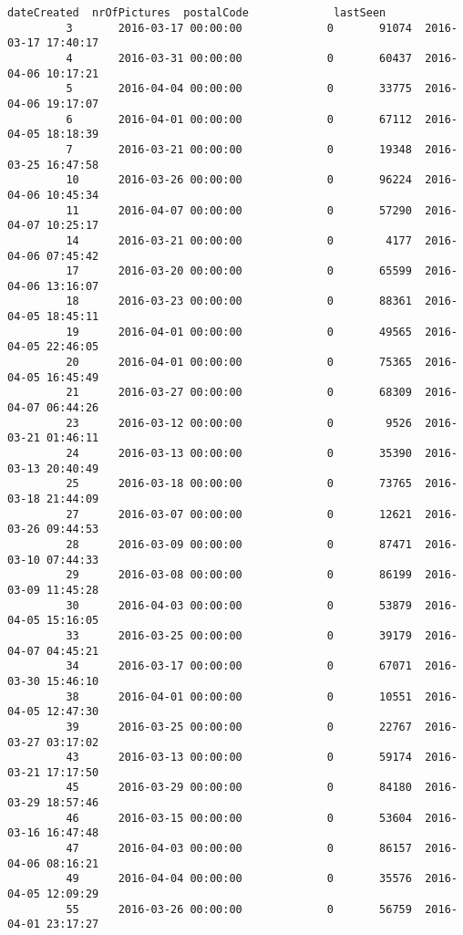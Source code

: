 \documentclass[11pt]{article}
\begin{document}
\begin{Verbatim}[commandchars=\\\{\}]
                         dateCreated  nrOfPictures  postalCode             lastSeen  
         3       2016-03-17 00:00:00             0       91074  2016-03-17 17:40:17  
         4       2016-03-31 00:00:00             0       60437  2016-04-06 10:17:21  
         5       2016-04-04 00:00:00             0       33775  2016-04-06 19:17:07  
         6       2016-04-01 00:00:00             0       67112  2016-04-05 18:18:39  
         7       2016-03-21 00:00:00             0       19348  2016-03-25 16:47:58  
         10      2016-03-26 00:00:00             0       96224  2016-04-06 10:45:34  
         11      2016-04-07 00:00:00             0       57290  2016-04-07 10:25:17  
         14      2016-03-21 00:00:00             0        4177  2016-04-06 07:45:42  
         17      2016-03-20 00:00:00             0       65599  2016-04-06 13:16:07  
         18      2016-03-23 00:00:00             0       88361  2016-04-05 18:45:11  
         19      2016-04-01 00:00:00             0       49565  2016-04-05 22:46:05  
         20      2016-04-01 00:00:00             0       75365  2016-04-05 16:45:49  
         21      2016-03-27 00:00:00             0       68309  2016-04-07 06:44:26  
         23      2016-03-12 00:00:00             0        9526  2016-03-21 01:46:11  
         24      2016-03-13 00:00:00             0       35390  2016-03-13 20:40:49  
         25      2016-03-18 00:00:00             0       73765  2016-03-18 21:44:09  
         27      2016-03-07 00:00:00             0       12621  2016-03-26 09:44:53  
         28      2016-03-09 00:00:00             0       87471  2016-03-10 07:44:33  
         29      2016-03-08 00:00:00             0       86199  2016-03-09 11:45:28  
         30      2016-04-03 00:00:00             0       53879  2016-04-05 15:16:05  
         33      2016-03-25 00:00:00             0       39179  2016-04-07 04:45:21  
         34      2016-03-17 00:00:00             0       67071  2016-03-30 15:46:10  
         38      2016-04-01 00:00:00             0       10551  2016-04-05 12:47:30  
         39      2016-03-25 00:00:00             0       22767  2016-03-27 03:17:02  
         43      2016-03-13 00:00:00             0       59174  2016-03-21 17:17:50  
         45      2016-03-29 00:00:00             0       84180  2016-03-29 18:57:46  
         46      2016-03-15 00:00:00             0       53604  2016-03-16 16:47:48  
         47      2016-04-03 00:00:00             0       86157  2016-04-06 08:16:21  
         49      2016-04-04 00:00:00             0       35576  2016-04-05 12:09:29  
         55      2016-03-26 00:00:00             0       56759  2016-04-01 23:17:27  

\end{Verbatim}
\end{document}
